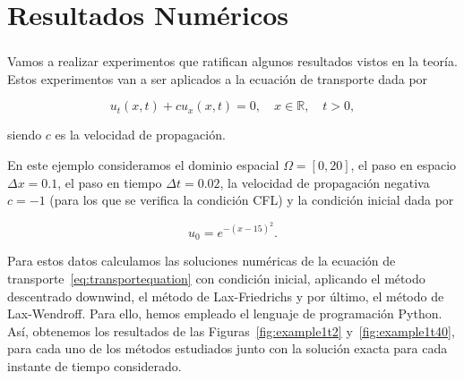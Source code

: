 \section{Resultados Numéricos}

\begin{frame}
    \frametitle{\secname}

    Vamos a realizar experimentos que ratifican algunos resultados vistos en la teoría.
    Estos experimentos van a ser aplicados a la ecuación de transporte
    dada por

    \begin{equation}\label{eq:transportequation}
        u_{t}
        \left(x,t\right)+
        cu_{x}
        \left(x,t\right)=
        0,\quad
        x\in\mathbb{R},\quad
        t>0,
    \end{equation}

    siendo $c$ es la velocidad de propagación.

    \begin{example}
        En este ejemplo consideramos el dominio espacial
        $\Omega=\left[0,20\right]$, el paso en espacio $\Delta x=0.1$, el
        paso en tiempo $\Delta t=0.02$, la velocidad de propagación negativa
        $c=-1$ (para los que se verifica la condición CFL) y la condición
        inicial dada por

        \begin{equation*}
            u_{0}=
            e^{-{\left(x-15\right)}^{2}}.
        \end{equation*}

        Para estos datos calculamos las soluciones numéricas de la ecuación
        de transporte~\eqref{eq:transportequation} con condición inicial,
        aplicando el método descentrado downwind, el método de Lax-Friedrichs
        y por último, el método de Lax-Wendroff.
        Para ello, hemos empleado el lenguaje de programación Python.
        Así, obtenemos los resultados de las Figuras~\ref{fig:example1t2}
        y~\ref{fig:example1t40}, para cada uno de los métodos estudiados
        junto con la solución exacta para cada instante de tiempo
        considerado.
    \end{example}
\end{frame}

